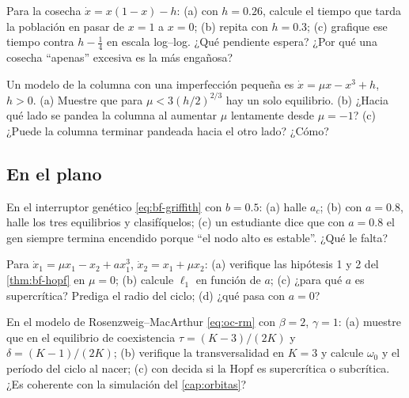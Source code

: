 \begin{problema}\label{prob:bf-colapso}
Para la cosecha $\dot x=x(1-x)-h$: (a) con $h=0.26$, calcule el tiempo que tarda la población en pasar de $x=1$ a $x=0$; (b) repita con $h=0.3$; (c) \etiquetaM{} grafique ese tiempo contra $h-\tfrac14$ en escala log--log. ¿Qué pendiente espera? ¿Por qué una cosecha ``apenas'' excesiva es la más engañosa?
\end{problema}

\begin{problema}\label{prob:bf-columna}
Un modelo de la columna con una imperfección pequeña es $\dot x=\mu x-x^3+h$, $h>0$. (a) Muestre que para $\mu<3(h/2)^{2/3}$ hay un solo equilibrio. (b) ¿Hacia qué lado se pandea la columna al aumentar $\mu$ lentamente desde $\mu=-1$? (c) ¿Puede la columna terminar pandeada hacia el otro lado? ¿Cómo?
\end{problema}

\subsection*{En el plano}

\begin{problema}\label{prob:bf-griffith}
En el interruptor genético \eqref{eq:bf-griffith} con $b=0.5$: (a) halle $a_c$; (b) con $a=0.8$, halle los tres equilibrios y clasifíquelos; (c) un estudiante dice que con $a=0.8$ el gen siempre termina encendido porque ``el nodo alto es estable''. ¿Qué le falta?
\end{problema}

\begin{problema}\label{prob:bf-hopfmano}
Para $\dot x_1=\mu x_1-x_2+ax_1^3$, $\dot x_2=x_1+\mu x_2$: (a) verifique las hipótesis 1 y 2 del \cref{thm:bf-hopf} en $\mu=0$; (b) calcule $\ell_1$ en función de $a$; (c) ¿para qué $a$ es supercrítica? Prediga el radio del ciclo; (d) ¿qué pasa con $a=0$?
\end{problema}

\begin{problema}\label{prob:bf-rm}
En el modelo de Rosenzweig--MacArthur \eqref{eq:oc-rm} con $\beta=2$, $\gamma=1$: (a) muestre que en el equilibrio de coexistencia $\tau=(K-3)/(2K)$ y $\delta=(K-1)/(2K)$; (b) verifique la transversalidad en $K=3$ y calcule $\omega_0$ y el período del ciclo al nacer; (c) \etiquetaM{} con  decida si la Hopf es supercrítica o subcrítica. ¿Es coherente con la simulación del \cref{cap:orbitas}?
\end{problema}


